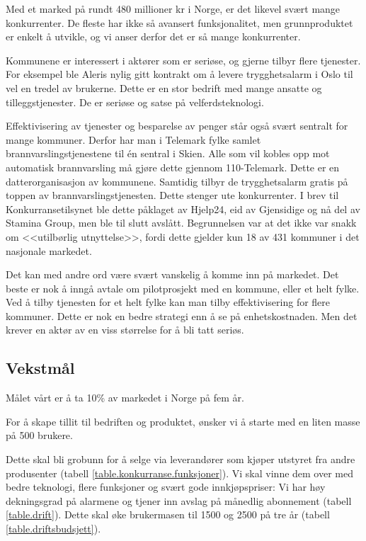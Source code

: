 Med et marked på rundt 480 millioner kr i Norge, er det likevel svært mange
konkurrenter. De fleste har ikke så avansert funksjonalitet, men grunnproduktet
er enkelt å utvikle, og vi anser derfor det er så mange konkurrenter.

Kommunene er interessert i aktører som er seriøse, og gjerne tilbyr flere
tjenester. For eksempel ble Aleris nylig gitt kontrakt om å levere
trygghetsalarm i Oslo \cite{telenor.aleris} til vel en tredel av brukerne.
Dette er en stor bedrift med mange ansatte og tilleggstjenester. De er seriøse
og satse på velferdsteknologi.

Effektivisering av tjenester og besparelse av penger står også svært sentralt
for mange kommuner. Derfor har man i Telemark fylke samlet
brannvarslingstjenestene til én sentral i Skien. Alle som vil kobles opp mot
automatisk brannvarsling må gjøre dette gjennom 110-Telemark. Dette er en
datterorganisasjon av kommunene. Samtidig tilbyr de trygghetsalarm gratis på
toppen av brannvarslingstjenesten. Dette stenger ute konkurrenter. I brev til
Konkurransetilsynet \cite{telemark.konkurransetilsyn} ble dette påklaget av
Hjelp24, eid av Gjensidige og nå del av Stamina Group, men ble til slutt
avslått. Begrunnelsen var at det ikke var snakk om <<utilbørlig utnyttelse>>,
fordi dette gjelder kun 18 av 431 kommuner i det nasjonale markedet.

Det kan med andre ord være svært vanskelig å komme inn på markedet. Det beste
er nok å inngå avtale om pilotprosjekt med en kommune, eller et helt fylke. Ved
å tilby tjenesten for et helt fylke kan man tilby effektivisering for flere
kommuner. Dette er nok en bedre strategi enn å se på enhetskostnaden. Men det
krever en aktør av en viss størrelse for å bli tatt seriøs.


\subsection{Vekstmål}

Målet vårt er å ta 10\% av markedet i Norge på fem år.


For å skape tillit til bedriften og produktet, ønsker vi å starte med en liten
masse på 500 brukere.

Dette skal bli grobunn for å selge via leverandører som kjøper utstyret fra
andre produsenter (tabell \vref{table.konkurranse.funksjoner}).  Vi skal vinne
dem over med bedre teknologi, flere funksjoner og svært gode innkjøpspriser: Vi
har høy dekningsgrad på alarmene og tjener inn avslag på månedlig abonnement
(tabell \vref{table.drift}).  Dette skal øke brukermasen til 1500 og 2500 på
tre år (tabell \vref{table.driftsbudsjett}).

